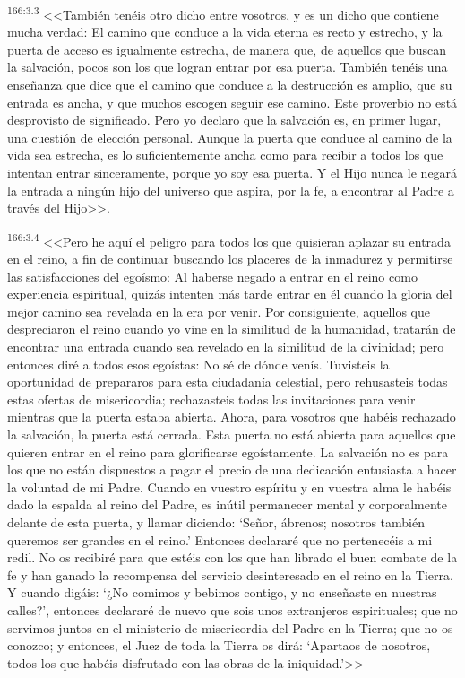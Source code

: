 \par 
\textsuperscript{166:3.3} <<También tenéis otro dicho entre vosotros, y es un dicho que contiene mucha verdad: El camino que conduce a la vida eterna es recto y estrecho, y la puerta de acceso es igualmente estrecha, de manera que, de aquellos que buscan la salvación, pocos son los que logran entrar por esa puerta. También tenéis una enseñanza que dice que el camino que conduce a la destrucción es amplio, que su entrada es ancha, y que muchos escogen seguir ese camino. Este proverbio no está desprovisto de significado. Pero yo declaro que la salvación es, en primer lugar, una cuestión de elección personal. Aunque la puerta que conduce al camino de la vida sea estrecha, es lo suficientemente ancha como para recibir a todos los que intentan entrar sinceramente, porque yo soy esa puerta. Y el Hijo nunca le negará la entrada a ningún hijo del universo que aspira, por la fe, a encontrar al Padre a través del Hijo>>.

\par 
\textsuperscript{166:3.4} <<Pero he aquí el peligro para todos los que quisieran aplazar su entrada en el reino, a fin de continuar buscando los placeres de la inmadurez y permitirse las satisfacciones del egoísmo: Al haberse negado a entrar en el reino como experiencia espiritual, quizás intenten más tarde entrar en él cuando la gloria del mejor camino sea revelada en la era por venir. Por consiguiente, aquellos que despreciaron el reino cuando yo vine en la similitud de la humanidad, tratarán de encontrar una entrada cuando sea revelado en la similitud de la divinidad; pero entonces diré a todos esos egoístas: No sé de dónde venís. Tuvisteis la oportunidad de prepararos para esta ciudadanía celestial, pero rehusasteis todas estas ofertas de misericordia; rechazasteis todas las invitaciones para venir mientras que la puerta estaba abierta. Ahora, para vosotros que habéis rechazado la salvación, la puerta está cerrada. Esta puerta no está abierta para aquellos que quieren entrar en el reino para glorificarse egoístamente. La salvación no es para los que no están dispuestos a pagar el precio de una dedicación entusiasta a hacer la voluntad de mi Padre. Cuando en vuestro espíritu y en vuestra alma le habéis dado la espalda al reino del Padre, es inútil permanecer mental y corporalmente delante de esta puerta, y llamar diciendo: `Señor, ábrenos; nosotros también queremos ser grandes en el reino.' Entonces declararé que no pertenecéis a mi redil. No os recibiré para que estéis con los que han librado el buen combate de la fe y han ganado la recompensa del servicio desinteresado en el reino en la Tierra. Y cuando digáis: `¿No comimos y bebimos contigo, y no enseñaste en nuestras calles?', entonces declararé de nuevo que sois unos extranjeros espirituales; que no servimos juntos en el ministerio de misericordia del Padre en la Tierra; que no os conozco; y entonces, el Juez de toda la Tierra os dirá: `Apartaos de nosotros, todos los que habéis disfrutado con las obras de la iniquidad.'>>

